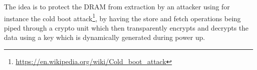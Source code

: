 The idea is to protect the DRAM from extraction by an attacker using for instance the cold boot attack\footnote{\url{https://en.wikipedia.org/wiki/Cold_boot_attack}},
by having the store and fetch operations being piped through a crypto unit which then transparently encrypts and decrypts the data using a key which
is dynamically generated during power up.